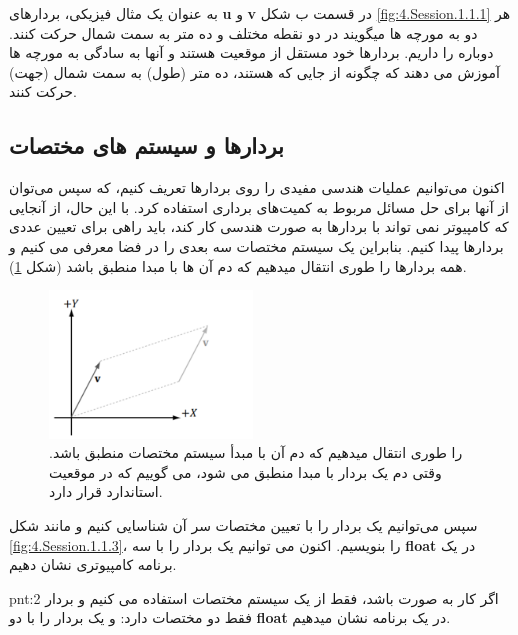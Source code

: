 {\begin{spacing}{1.4}
        به عنوان یک مثال فیزیکی، بردارهای \textbf{u} و \textbf{v} در قسمت ب شکل \ref{fig:4.Session.1.1.1} هر دو به مورچه ها میگویند در دو نقطه مختلف  و  ده متر به سمت شمال حرکت کنند.
        دوباره  را داریم.
        بردارها خود مستقل از موقعیت هستند و
        آنها به سادگی به مورچه ها آموزش می دهند که چگونه از جایی که هستند، ده متر (طول) به سمت شمال (جهت) حرکت کنند.

    \end{spacing}
}

\subsection{\textbf{بردارها و سیستم های مختصات}}
{
    \Large
    \begin{spacing}{1.5}
        اکنون می‌توانیم عملیات هندسی مفیدی را روی بردارها تعریف کنیم، که سپس می‌توان از آنها برای حل مسائل مربوط به کمیت‌های برداری استفاده کرد.
        با این حال، از آنجایی که کامپیوتر نمی تواند با بردارها به صورت هندسی کار کند، باید راهی برای تعیین عددی بردارها پیدا کنیم.
        بنابراین یک سیستم مختصات سه بعدی را در فضا معرفی می کنیم و همه بردارها را طوری انتقال میدهیم که دم آن ها با مبدا منطبق باشد (شکل \ref{fig:4.Session.1.1.2}).

        \begin{figure}[H]
            \centering
            \setlength{\belowcaptionskip}{-10pt}
            \includegraphics[width=0.48\textwidth]{Images/4/4.Session.1.1.2}
            \caption{ را طوری انتقال میدهیم که دم آن با مبدأ سیستم مختصات منطبق
            باشد. وقتی دم یک بردار با مبدا منطبق می شود، می گوییم که در موقعیت استاندارد قرار دارد.}
            \label{fig:4.Session.1.1.2}
        \end{figure}

        سپس می‌توانیم یک بردار را با تعیین مختصات سر آن شناسایی کنیم و مانند شکل \ref{fig:4.Session.1.1.3}،  را بنویسیم.
        اکنون می توانیم یک بردار را با سه \textbf{float} در یک برنامه کامپیوتری نشان دهیم.
        \textbf{\vspace{-10pt}}
        \begin{point}{pnt:2}
            \Large
            اگر کار به صورت  باشد، فقط از یک سیستم مختصات  استفاده می کنیم و بردار فقط دو مختصات دارد:
             و یک بردار را با دو \textbf{float} در یک برنامه نشان میدهیم.
        \end{point}


\end{spacing}}
